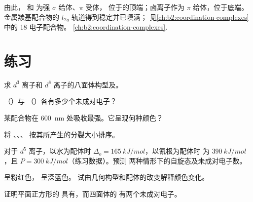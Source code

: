 由此， 和  为强 $\sigma$ 给体、$\pi$ 受体，
位于的顶端；卤离子作为 $\pi$ 给体，位于底端。金属羰基配合物的 $t_{2g}$ 轨道得到稳定并已填满；
见\cref{ch:b2:coordination-complexes}中的 18 电子配合物。
\cref{ch:b2:coordination-complexes}.

\section{练习}

\begin{exercise}[$\star$]\label{exo:b2:ligand-field:1}
求 $d^3$ 离子和 $d^8$ 离子的八面体构型及。
\end{exercise}

\begin{exercise}[$\star$]\label{exo:b2:ligand-field:2}
（）与 （）各有多少个未成对电子？
\end{exercise}

\begin{exercise}[$\star$]\label{exo:b2:ligand-field:3}
某配合物在 \qty{600}{nm} 处吸收最强。它呈现何种颜色？
\end{exercise}

\begin{exercise}[$\star$]\label{exo:b2:ligand-field:4}
将 、、、 按其所产生的分裂大小排序。
\end{exercise}

\begin{exercise}[$\star\star$]\label{exo:b2:ligand-field:5}
对于 $d^5$ 离子，以水为配体时 $\Delta_o = \qty{165}{kJ/mol}$，以氰根为配体时
为 $\qty{390}{kJ/mol}$，且 $P = \qty{300}{kJ/mol}$（练习数据）。预测
两种情形下的自旋态及未成对电子数。
\end{exercise}

\begin{exercise}[$\star\star$]\label{exo:b2:ligand-field:6}
 呈粉红色， 呈深蓝色。
试由几何构型和配体的改变解释颜色变化。
\end{exercise}

\begin{exercise}[$\star\star$]\label{exo:b2:ligand-field:7}
证明平面正方形的  具有，而四面体的
 有两个未成对电子。
\end{exercise}


